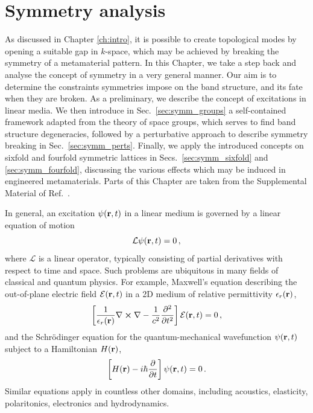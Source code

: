 
\chapter{Symmetry analysis} \label{ch:symmetry}

\begin{chapterabstract}
		
	As discussed in Chapter \ref{ch:intro}, it is possible to create topological modes by opening a suitable gap in $k$-space, which may be achieved by breaking the symmetry of a metamaterial pattern. In this Chapter, we take a step back and analyse the concept of symmetry in a very general manner. Our aim is to determine the constraints symmetries impose on the band structure, and its fate when they are broken. As a preliminary, we describe the concept of excitations in linear media. We then introduce in Sec.~\ref{sec:symm_groups} a self-contained framework adapted from the theory of space groups, which serves to find band structure degeneracies, followed by a perturbative approach to describe symmetry breaking in Sec.~\ref{sec:symm_perts}. Finally, we apply the introduced concepts on sixfold and fourfold symmetric lattices in Secs.~\ref{sec:symm_sixfold} and \ref{sec:symm_fourfold}, discussing the various effects which may be induced in engineered metamaterials. 	
	\tcblower
	Parts of this Chapter are taken from the Supplemental Material of Ref.~\cite{Kosata_2021}.
\end{chapterabstract}

In general, an excitation $\psi(\vb{r} ,t)$ in a linear medium is governed by a linear equation of motion
\begin{equation} \label{eq:symm_eom_gen}
\mathcal{L} \psi(\vb{r}, t) =  0 \,,
\end{equation}
where $\mathcal{L}$ is a linear operator, typically consisting of partial derivatives with respect to time and space.
Such problems are ubiquitous in many fields of classical and quantum physics. For example, Maxwell's equation describing the out-of-plane electric field $\mathcal{E}(\vb{r}, t)$ in a 2D medium of relative permittivity $\epsilon_r(\vb{r})$,
\begin{equation} \label{eq:symm_maxwell}
\left[ \frac{1}{\epsilon_r(\vb{r})} \nabla \cross \nabla - \frac{1}{c^2}\frac{\partial^2}{\partial t^2} \right] \mathcal{E}(\vb{r}, t) = 0 \,,
\end{equation}
and the Schr\"{o}dinger equation for the quantum-mechanical wavefunction $\psi(\vb{r}, t)$ subject to a Hamiltonian $H(\vb{r})$,
\begin{equation} \label{eq:symm_se}
\left[H(\vb{r}) - i \hbar \frac{\partial}{\partial t} \right] \psi(\vb{r}, t) = 0 \,.
\end{equation}
Similar equations apply in countless other domains, including acoustics, elasticity, polaritonics, electronics and hydrodynamics.


